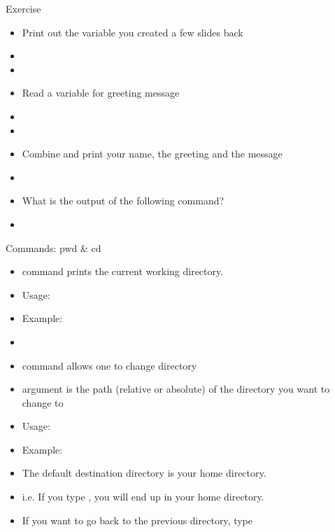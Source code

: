 \documentclass[10pt,t]{beamer}
\begin{document}
\begin{frame}
  \begin{exampleblock}{Exercise}
    \begin{itemize}
      \item Print out the variable you created a few slides back
      \item[] 
      \item[] 
      \item Read a variable for greeting message
      \item[] 
      \item[] 
      \item Combine and print your name, the greeting and the message
      \item[] 
      \item What is the output of the following command?
      \item[] 
    \end{itemize}
  \end{exampleblock}
\end{frame}

\begin{frame}[fragile]{Commands: pwd \& cd}
  \begin{itemize}
    \item {} command prints the current working directory.
    \item Usage: 
    \item Example: 
    \item[]{}
    \item {} command allows one to change directory
    \item argument is the path (relative or absolute) of the directory you want to change to
    \item Usage: 
    \item Example: 
    \item The default destination directory is your home directory.
    \item i.e. If you type , you will end up in your home directory.
    \item If you want to go back to the previous directory, type 
  \end{itemize}
\end{frame}
\end{document}
